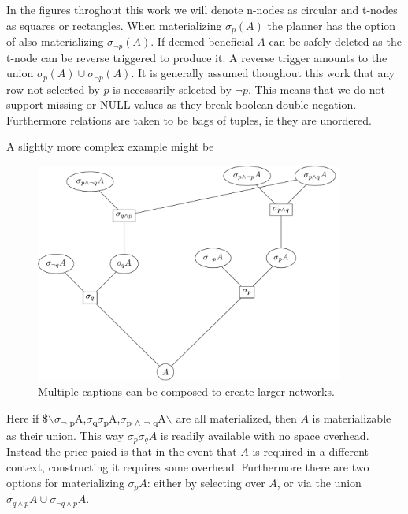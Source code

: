 In the figures throghout this work we will denote n-nodes as
circular and t-nodes as squares or rectangles. When materializing
\(\sigma_p(A)\) the planner has the option of also materializing
\(\sigma_{\neg p}(A)\). If deemed beneficial \(A\) can be safely
deleted as the t-node can be reverse triggered to produce it. A
reverse trigger amounts to the union \(\sigma_{p}(A) \cup
\sigma_{\neg p}(A)\). It is generally assumed thoughout this work
that any row not selected by \(p\) is necessarily selected by \(\neg
p\). This means that we do not support missing or NULL values as
they break boolean double negation. Furthermore relations are taken
to be bags of tuples, ie they are unordered.

A slightly more complex example might be

\begin{figure}[H]
  \centering
  \includegraphics[width=0.9\textwidth]{./imgs/selsub.pdf}
  \caption{\label{fig:orgd6664d1}Multiple captions can be composed to create larger networks.}
\end{figure}

Here if \$$\backslash${\(\sigma\)\textsubscript{\(\neg{}\) p}A,\(\sigma\)\textsubscript{q}\(\sigma\)\textsubscript{p}A,\(\sigma\)\textsubscript{p \(\land\) \(\neg{}\)
    q}A$\backslash$} are all materialized, then \(A\) is materializable as their
union. This way \(\sigma_p\sigma_qA\) is readily available with no space
overhead. Instead the price paied is that in the event that \(A\) is
required in a different context, constructing it requires some
overhead. Furthermore there are two options for materializing
\(\sigma_pA\): either by selecting over \(A\), or via the union
\(\sigma_{q \land p}A \cup \sigma_{\neg q \land p}A\).

